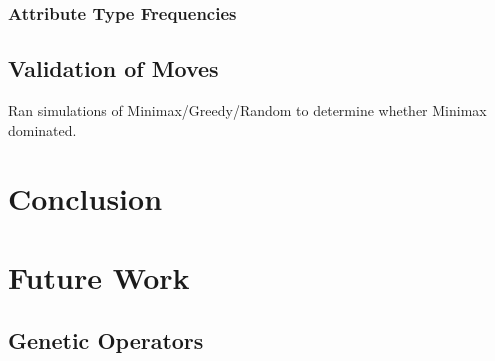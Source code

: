 \documentclass{acm_proc_article-sp}
\begin{document}
        \subsubsection{Attribute Type Frequencies}
    
    \subsection{Validation of Moves}
        
        Ran simulations of Minimax/Greedy/Random to determine whether Minimax dominated.

\section{Conclusion}

    
\section{Future Work}

    \subsection{Genetic Operators}


%


\begin{thebibliography}{1}


\end{thebibliography}


\balancecolumns
\end{document}
